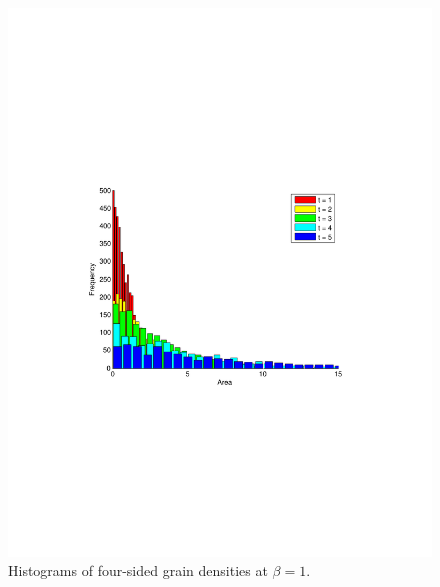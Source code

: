 \begin{figure}
\includegraphics[width=\textwidth]{histbetaonetier4.pdf}
\vspace{-130pt}
\caption{Histograms of four-sided grain densities at $\beta = 1$.}
\end{figure}

